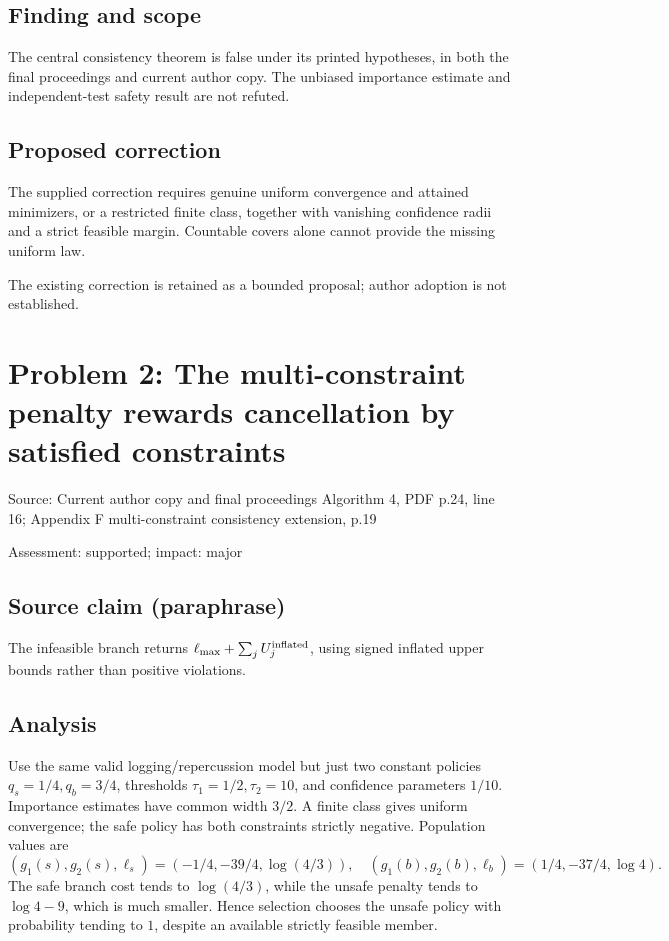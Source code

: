 \documentclass[11pt]{article}
\begin{document}
\subsection*{Finding and scope}

The central consistency theorem is false under its printed hypotheses, in both the final proceedings and current author copy. The unbiased importance estimate and independent-test safety result are not refuted.

\subsection*{Proposed correction}

The supplied correction requires genuine uniform convergence and attained minimizers, or a restricted finite class, together with vanishing confidence radii and a strict feasible margin. Countable covers alone cannot provide the missing uniform law.

The existing correction is retained as a bounded proposal; author adoption is not established.

\section*{Problem 2: The multi-constraint penalty rewards cancellation by satisfied constraints}

Source: Current author copy and final proceedings Algorithm 4, PDF p.24, line 16; Appendix F multi-constraint consistency extension, p.19

Assessment: supported; impact: major

\subsection*{Source claim (paraphrase)}

The infeasible branch returns \(\ell_{\max}+\sum_jU_j^{\rm inflated}\), using signed inflated upper bounds rather than positive violations.

\subsection*{Analysis}

Use the same valid logging/repercussion model but just two constant policies \(q_s=1/4,q_b=3/4\), thresholds \(\tau_1=1/2,\tau_2=10\), and confidence parameters \(1/10\). Importance estimates have common width \(3/2\). A finite class gives uniform convergence; the safe policy has both constraints strictly negative. Population values are \[(g_1(s),g_2(s),\ell_s)=(-1/4,-39/4,\log(4/3)),\quad(g_1(b),g_2(b),\ell_b)=(1/4,-37/4,\log4).\] The safe branch cost tends to \(\log(4/3)\), while the unsafe penalty tends to \(\log4-9\), which is much smaller. Hence selection chooses the unsafe policy with probability tending to \(1\), despite an available strictly feasible member.
\end{document}

